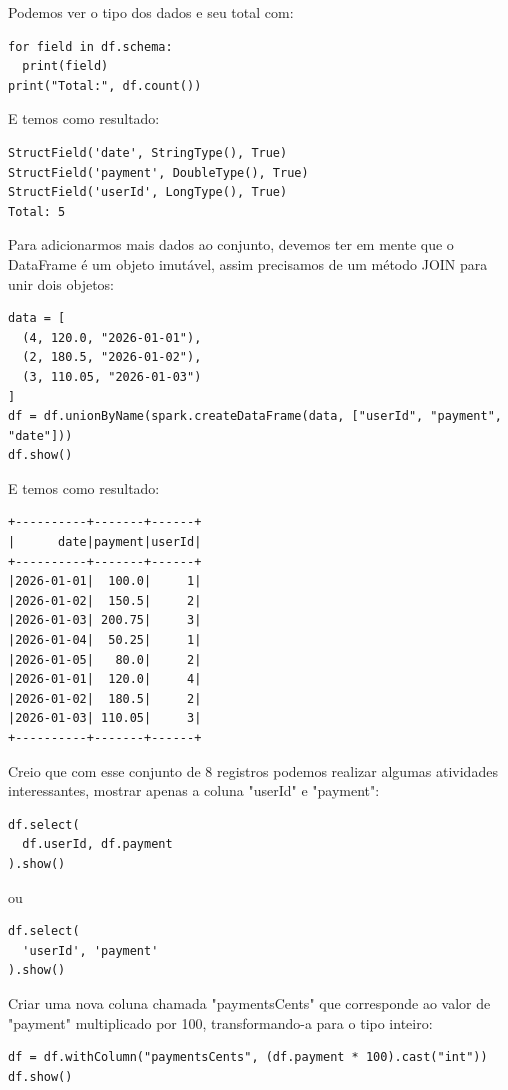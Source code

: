 Podemos ver o tipo dos dados e seu total com:
\begin{lstlisting}[]
for field in df.schema:
  print(field)
print("Total:", df.count()) 
\end{lstlisting}

E temos como resultado:
\begin{verbatim}
StructField('date', StringType(), True)
StructField('payment', DoubleType(), True)
StructField('userId', LongType(), True)
Total: 5	
\end{verbatim}

Para adicionarmos mais dados ao conjunto, devemos ter em mente que o DataFrame é um objeto imutável, assim precisamos de um método JOIN para unir dois objetos:
\begin{lstlisting}[]
data = [
  (4, 120.0, "2026-01-01"),
  (2, 180.5, "2026-01-02"),
  (3, 110.05, "2026-01-03")
]
df = df.unionByName(spark.createDataFrame(data, ["userId", "payment", "date"]))
df.show()
\end{lstlisting}

E temos como resultado:
\begin{verbatim}
+----------+-------+------+
|      date|payment|userId|
+----------+-------+------+
|2026-01-01|  100.0|     1|
|2026-01-02|  150.5|     2|
|2026-01-03| 200.75|     3|
|2026-01-04|  50.25|     1|
|2026-01-05|   80.0|     2|
|2026-01-01|  120.0|     4|
|2026-01-02|  180.5|     2|
|2026-01-03| 110.05|     3|
+----------+-------+------+	
\end{verbatim}

Creio que com esse conjunto de 8 registros podemos realizar algumas atividades interessantes, mostrar apenas a coluna "userId" e "payment":

\begin{lstlisting}[]
df.select(
  df.userId, df.payment
).show()	
\end{lstlisting}

ou 

\begin{lstlisting}[]
df.select(
  'userId', 'payment'
).show()	
\end{lstlisting}

Criar uma nova coluna chamada "paymentsCents" que corresponde ao valor de "payment" multiplicado por 100, transformando-a para o tipo inteiro:
\begin{lstlisting}[]
df = df.withColumn("paymentsCents", (df.payment * 100).cast("int"))
df.show()
\end{lstlisting}

